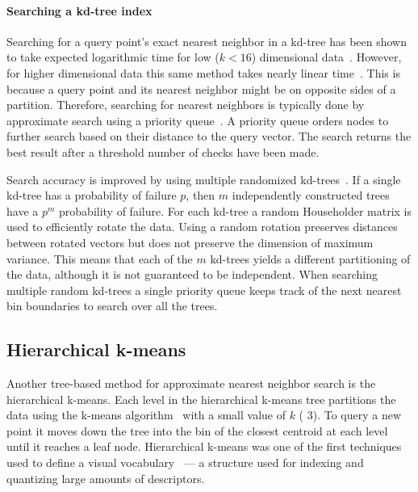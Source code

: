         \paragraph{Searching a kd-tree index}
        Searching for a query point's exact nearest neighbor in a kd-tree has been shown to take expected
        logarithmic time for low ($k < 16$) dimensional data~\cite{friedman_algorithm_1977}. However, for higher
        dimensional data this same method takes nearly linear time~\cite{sproull_refinements_1991}. This is because
        a query point and its nearest neighbor might be on opposite sides of a partition. Therefore, searching for
        nearest neighbors is typically done by approximate search using a priority queue~\cite{beis_shape_1997}. A
        priority queue orders nodes to further search based on their distance to the query vector. The search
        returns the best result after a threshold number of checks have been made. %

        Search accuracy is improved by using multiple randomized kd-trees~\cite{silpa_anan_optimised_2008}. If a
        single kd-tree has a probability of failure $p$, then $m$ independently constructed trees have a $p^m$
        probability of failure. For each kd-tree a random Householder matrix is used to efficiently rotate the
        data. Using a random rotation preserves distances between rotated vectors but does not preserve the
        dimension of maximum variance. This means that each of the $m$ kd-trees yields a different partitioning of
        the data, although it is not guaranteed to be independent. When searching multiple random kd-trees a single
        priority queue keeps track of the next nearest bin boundaries to search over all the trees.

    \subsection{Hierarchical k-means}
        Another tree-based method for approximate nearest neighbor search is the hierarchical k-means. Each level
        in the hierarchical k-means tree partitions the data using the k-means algorithm~\cite{lloyd_least_1982}
        with a small value of $k$ (\eg{} 3). To query a new point it moves down the tree into the bin of the
        closest centroid at each level until it reaches a leaf node. Hierarchical k-means was one of the first
        techniques used to define a visual vocabulary~\cite{nister_scalable_2006} --- a structure used for indexing
        and quantizing large amounts of descriptors.
    

